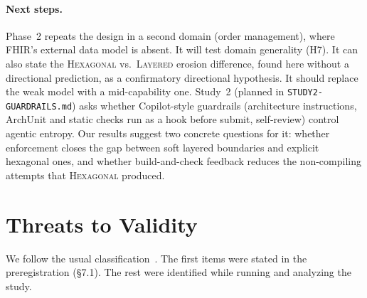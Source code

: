 \documentclass[10pt]{article}
\newcommand{\LAY}{\textsc{Layered}}
\newcommand{\HEX}{\textsc{Hexagonal}}
\newcommand{\code}[1]{\texttt{#1}}
\begin{document}
\paragraph{Next steps.} Phase~2 repeats the design in a second domain (order management), where
FHIR's external data model is absent. It will test domain generality (H7). It can also state the
\HEX{} vs.\ \LAY{} erosion difference, found here without a directional prediction, as a confirmatory
directional hypothesis. It should replace the weak model with a mid-capability one. Study~2 (planned
in \code{STUDY2-GUARDRAILS.md}) asks whether Copilot-style guardrails (architecture instructions,
ArchUnit and static checks run as a hook before submit, self-review) control agentic entropy. Our
results suggest two concrete questions for it: whether enforcement closes the gap between soft
layered boundaries and explicit hexagonal ones, and whether build-and-check feedback reduces the
non-compiling attempts that \HEX{} produced.

\section{Threats to Validity}\label{sec:threats}

We follow the usual classification~\citep{wohlin2012experimentation}. The first items were stated
in the preregistration (\S7.1). The rest were identified while running and analyzing the study.
\end{document}
